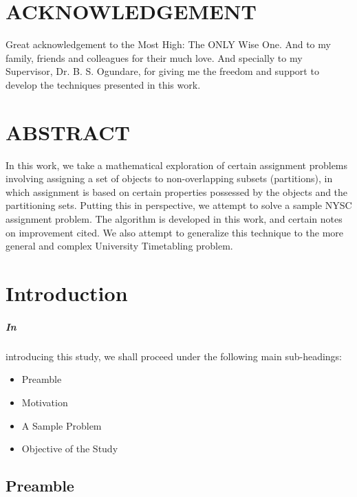 \documentclass[a4paper,openany]{book}
\begin{document}
	\chapter[ACKNOWLEDGEMENT]{ \centering ACKNOWLEDGEMENT}
		Great acknowledgement to the Most High: The ONLY Wise One. And to my family, friends and colleagues for their much love. And specially to my Supervisor, Dr. B. S. Ogundare, for giving me the freedom and support to develop the techniques presented in this work.
	\chapter[ABSTRACT]{ \centering ABSTRACT}
		In this work, we take a mathematical exploration of certain assignment problems involving assigning a set of objects to non-overlapping subsets (partitions), in which assignment is based on certain properties possessed by the objects and the partitioning sets. Putting this in perspective, we attempt to solve a sample NYSC assignment problem. The algorithm is developed in this work, and certain notes on improvement cited.  We also attempt to generalize this technique to the more general and complex University Timetabling problem.
	\tableofcontents
	\listoftables
	\mainmatter
    \linespread{2.0}
    \chapter{Introduction}
        \paragraph{In}
        introducing this study, we shall proceed under the following main sub-headings:
        \begin{itemize}
            \item Preamble
            \item Motivation
            \item A Sample Problem
            \item Objective of the Study
        \end{itemize}
        \section{Preamble}
\end{document}
